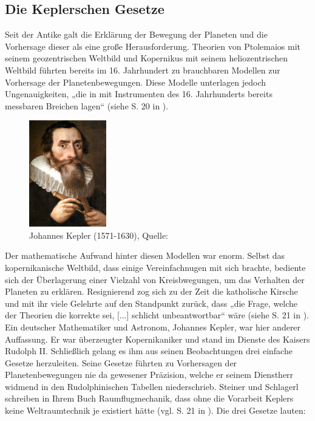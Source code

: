 \subsection{Die Keplerschen Gesetze}
Seit der Antike galt die Erklärung der Bewegung der Planeten und die Vorhersage dieser als eine große Herausforderung. Theorien von Ptolemaios mit seinem geozentrischen Weltbild und Kopernikus mit seinem heliozentrischen Weltbild führten bereits im 16. Jahrhundert zu brauchbaren Modellen zur Vorhersage der Planetenbewegungen. Diese Modelle unterlagen jedoch Ungenauigkeiten, „die in mit Instrumenten des 16. Jahrhunderts bereits messbaren Breichen lagen“ (siehe S. 20 in \cite{Raumflugm}). 
\begin{figure}[h]                                                                       %
	\centering                                                                            	%
	\includegraphics[width=0.3\textwidth]{./images/kepler.jpg}                        %
	\caption[Bahnelemente]{Johannes Kepler (1571-1630), Quelle: \cite{Wiki:Kepler}}                        %
	\label{fig:bahnelemente}                                                                %
\end{figure}                                                                              	%
Der mathematische Aufwand hinter diesen Modellen war enorm. Selbst das kopernikanische Weltbild, dass einige Vereinfachnugen mit sich brachte, bediente sich der Überlagerung einer Vielzahl von Kreisbwegungen, um das Verhalten der Planeten zu erklären. Resignierend zog sich zu der Zeit die katholische Kirsche und mit ihr viele Gelehrte auf den Standpunkt zurück, dass „die Frage, welche der Theorien die korrekte sei, [...] schlicht unbeantwortbar“ wäre (siehe S. 21 in \cite{Raumflugm}). 
\newpar
Ein deutscher Mathematiker und Astronom, Johannes Kepler, war hier anderer Auffassung. Er war überzeugter Kopernikaniker und stand im Dienste des Kaisers Rudolph II. Schließlich gelang es ihm aus seinen Beobachtungen drei einfache Gesetze herzuleiten. Seine Gesetze führten zu Vorhersagen der Planetenbewegungen nie da gewesener Präzision, welche er seinem Dienstherr widmend in den Rudolphinischen Tabellen niederschrieb. Steiner und Schlagerl schreiben in Ihrem Buch Raumflugmechanik, dass ohne die Vorarbeit Keplers keine Weltraumtechnik je existiert hätte (vgl. S. 21 in \cite{Raumflugm}). Die drei Gesetze lauten:
